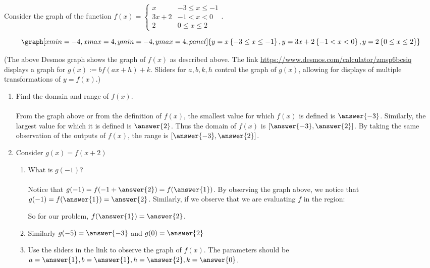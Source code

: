 \documentclass{ximera}
\begin{document}
\begin{question}
Consider the graph of the function $f(x)=\begin{cases}   x & -3\leq x \leq -1 \\ 3x+2 &-1<x<0 \\ 2 & 0\leq x\leq 2\end{cases}.$

 \begin{onlineOnly}
   \[
   \graph[xmin=-4,xmax=4,ymin=-4,ymax=4, panel]{y=x\left\{-3\leq x\leq -1\right\},y=3x+2\left\{-1<x<0\right\},y=2\left\{0 \leq x\leq 2\right\}} 
   \]
 \end{onlineOnly}
(The above Desmos graph shows the graph of $f(x)$ as described above.  The link \url{https://www.desmos.com/calculator/zmsp6bcsiq} displays a graph for $g(x):=bf(ax+h)+k$.  Sliders for $a,b,k,h$ control the graph of $g(x)$, allowing for displays of multiple transformations of $y=f(x)$.)


\begin{enumerate}
\item Find the domain and range of $f(x)$.\\ \\ From the graph above or from the definition of $f(x)$, the smallest value for which $f(x)$ is defined is $\answer{-3}$.  Similarly, the largest value for which it is defined is $\answer{2}$.  Thus the domain of $f(x)$ is $[\answer{-3}, \answer{2}]$.  By taking the same observation of the outputs of $f(x)$, the range is $[\answer{-3}, \answer{2}]$.

\item Consider $g(x)=f(x+2)$
\begin{enumerate}
\item What is $g(-1)$?  \\ \\ Notice that $g(-1)=f(-1+\answer{2})=f(\answer{1})$.  By observing the graph above, we notice that $g(-1)=f(\answer{1})=\answer{2}$.  Similarly, if we observe that we are evaluating $f$ in the region:

\begin{multipleChoice}
\end{multipleChoice}

So for our problem, $f(\answer{1})=\answer{2}$.

\item Similarly $g(-5)=\answer{-3}$ and $g(0)=\answer{2}$

\item Use the sliders in the link to observe the graph of $f(x)$.  The parameters should be $a=\answer{1}, b=\answer{1}, h=\answer{2}, k=\answer{0}$.


\end{enumerate}
\end{enumerate}
\end{question}
\end{document}
